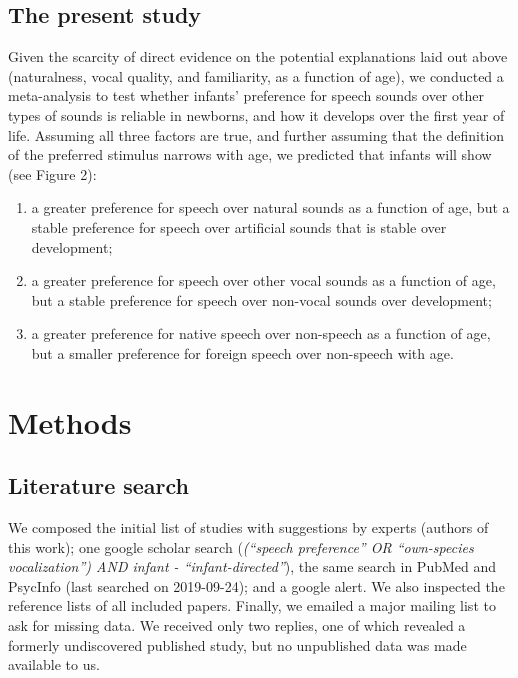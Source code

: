 \documentclass[man]{apa6}
\providecommand{\tightlist}{%
  \setlength{\itemsep}{0pt}\setlength{\parskip}{0pt}}
\begin{document}
\hypertarget{the-present-study}{%
\subsection{The present study}\label{the-present-study}}

Given the scarcity of direct evidence on the potential explanations laid out above (naturalness, vocal quality, and familiarity, as a function of age), we conducted a meta-analysis to test whether infants' preference for speech sounds over other types of sounds is reliable in newborns, and how it develops over the first year of life. Assuming all three factors are true, and further assuming that the definition of the preferred stimulus narrows with age, we predicted that infants will show (see Figure 2):

\begin{enumerate}
\def\labelenumi{\arabic{enumi}.}
\tightlist
\item
  a greater preference for speech over natural sounds as a function of age, but a stable preference for speech over artificial sounds that is stable over development;
\item
  a greater preference for speech over other vocal sounds as a function of age, but a stable preference for speech over non-vocal sounds over development;
\item
  a greater preference for native speech over non-speech as a function of age, but a smaller preference for foreign speech over non-speech with age.
\end{enumerate}

\hypertarget{methods}{%
\section{Methods}\label{methods}}

\hypertarget{literature-search}{%
\subsection{Literature search}\label{literature-search}}

We composed the initial list of studies with suggestions by experts (authors of this work); one google scholar search (\emph{(\enquote{speech preference} OR \enquote{own-species vocalization}) AND infant - \enquote{infant-directed}}), the same search in PubMed and PsycInfo (last searched on 2019-09-24); and a google alert. We also inspected the reference lists of all included papers. Finally, we emailed a major mailing list to ask for missing data. We received only two replies, one of which revealed a formerly undiscovered published study, but no unpublished data was made available to us.
\end{document}
